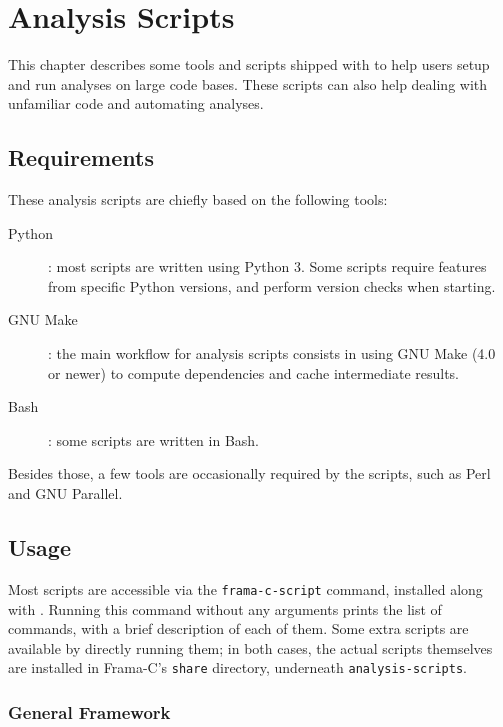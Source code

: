
\chapter{Analysis Scripts}
\label{user-analysis-scripts}

This chapter describes some tools and scripts shipped with \FramaC to help
users setup and run analyses on large code bases. These scripts can also help
dealing with unfamiliar code and automating analyses.

\section{Requirements}

These analysis scripts are chiefly based on the following tools:

\begin{description}
\item[Python]: most scripts are written using Python 3. Some scripts require
  features from specific Python versions, and perform version checks when
  starting.
\item[GNU Make]: the main workflow for analysis scripts consists in using
  GNU Make (4.0 or newer) to compute dependencies and cache intermediate
  results.
\item[Bash]: some scripts are written in Bash.
\end{description}

Besides those, a few tools are occasionally required by the scripts, such as
Perl and GNU Parallel.

\section{Usage}

Most scripts are accessible via the \texttt{frama-c-script} command, installed
along with \FramaC. Running this command without any arguments prints the list
of commands, with a brief description of each of them. Some extra scripts are
available by directly running them; in both cases, the actual scripts
themselves are installed in Frama-C's \texttt{share} directory, underneath
\texttt{analysis-scripts}.

\subsection{General Framework}

